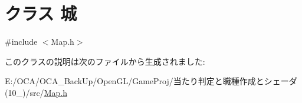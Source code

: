 \hypertarget{class_xE5_x9F_x8E}{\section{クラス 城}
\label{class_xE5_x9F_x8E}
}


{\ttfamily \#include $<$Map.\-h$>$}



このクラスの説明は次のファイルから生成されました\-:\begin{DoxyCompactItemize}
\item 
E\-:/\-O\-C\-A/\-O\-C\-A\-\_\-\-Back\-Up/\-Open\-G\-L/\-Game\-Proj/当たり判定と職種作成とシェーダ(10\-\_)/src/\hyperlink{_map_8h}{Map.\-h}\end{DoxyCompactItemize}
